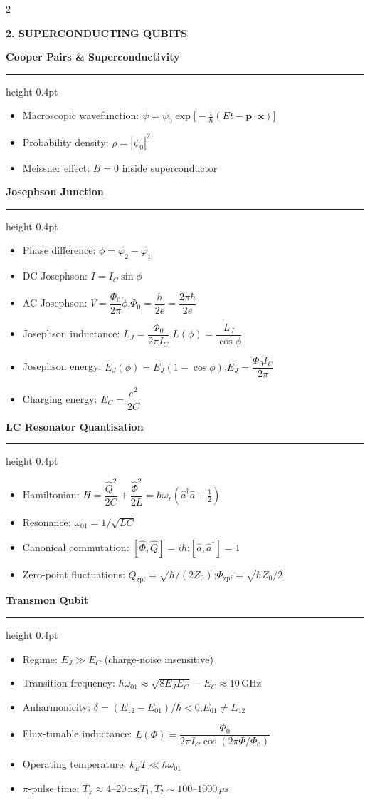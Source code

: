 \documentclass[10pt,a4paper]{article}
\newcommand{\sectionbox}[1]{%
  \vspace{3pt}%
  \noindent\colorbox{headerbg}{\parbox{\linewidth-2\fboxsep}%
    {\bfseries\small\color{white}\MakeUppercase{#1}}}%
  \vspace{1pt}%
}
\newcommand{\subsec}[1]{%
  \vspace{3pt}%
  {\small\bfseries\color{subseccolor}#1}%
  \vspace{1pt}\hrule height 0.4pt \vspace{2pt}%
}
\begin{document}
\begin{multicols}{2}
\sectionbox{2. Superconducting Qubits}

\subsec{Cooper Pairs \& Superconductivity}
\begin{itemize}
  \item Macroscopic wavefunction: $\psi=\psi_0\exp\!\bigl[-\tfrac{i}{\hbar}(Et-\mathbf{p}\cdot\mathbf{x})\bigr]$
  \item Probability density: $\rho=|\psi_0|^2$
  \item Meissner effect: $B=0$ inside superconductor
\end{itemize}

\subsec{Josephson Junction}
\begin{itemize}
  \item Phase difference: $\phi=\varphi_2-\varphi_1$
  \item DC Josephson: $I=I_C\sin\phi$
  \item AC Josephson: $V=\dfrac{\Phi_0}{2\pi}\dot\phi$,\quad $\Phi_0=\dfrac{h}{2e}=\dfrac{2\pi\hbar}{2e}$
  \item Josephson inductance: $L_J=\dfrac{\Phi_0}{2\pi I_C}$,\quad $L(\phi)=\dfrac{L_J}{\cos\phi}$
  \item Josephson energy: $E_J(\phi)=E_J(1-\cos\phi)$,\quad $E_J=\dfrac{\Phi_0 I_C}{2\pi}$
  \item Charging energy: $E_C=\dfrac{e^2}{2C}$
\end{itemize}

\subsec{LC Resonator Quantisation}
\begin{itemize}
  \item Hamiltonian: $H=\dfrac{\hat Q^2}{2C}+\dfrac{\hat\Phi^2}{2L}=\hbar\omega_r\!\left(\hat a^\dagger\hat a+\tfrac{1}{2}\right)$
  \item Resonance: $\omega_{01}=1/\sqrt{LC}$
  \item Canonical commutation: $[\hat\Phi,\hat Q]=i\hbar$;\quad $[\hat a,\hat a^\dagger]=1$
  \item Zero-point fluctuations: $Q_\text{zpf}=\sqrt{\hbar/(2Z_0)}$;\quad $\Phi_\text{zpf}=\sqrt{\hbar Z_0/2}$
\end{itemize}

\subsec{Transmon Qubit}
\begin{itemize}
  \item Regime: $E_J\gg E_C$ (charge-noise insensitive)
  \item Transition frequency: $\hbar\omega_{01}\approx\sqrt{8E_JE_C}-E_C\approx 10\,\text{GHz}$
  \item Anharmonicity: $\delta=(E_{12}-E_{01})/\hbar<0$;\quad $E_{01}\neq E_{12}$
  \item Flux-tunable inductance: $L(\Phi)=\dfrac{\Phi_0}{2\pi I_C\cos(2\pi\Phi/\Phi_0)}$
  \item Operating temperature: $k_BT\ll\hbar\omega_{01}$
  \item $\pi$-pulse time: $T_\pi\approx 4$–$20\,\text{ns}$;\quad $T_1,T_2\sim 100$–$1000\,\mu\text{s}$
\end{itemize}


\end{multicols}
\end{document}

